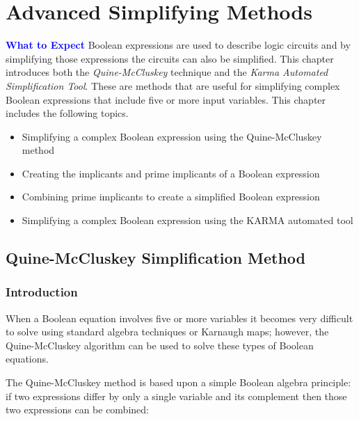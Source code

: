 \chapter{Advanced Simplifying Methods}\label{ch07}

\begin{tcolorbox}[colback=blue!5!white,colframe=blue!75!black]
	\textcolor{blue}{\textbf{What to Expect}}
	\tcblower
	Boolean expressions are used to describe logic circuits and by simplifying those expressions the circuits can also be simplified. This chapter introduces both the \textit{Quine-McCluskey} technique and the \textit{Karma Automated Simplification Tool}. These are methods that are useful for simplifying complex Boolean expressions that include five or more input variables. This chapter includes the following topics.
	
	\begin{itemize}
		\item Simplifying a complex Boolean expression using the Quine-McCluskey method
		\item Creating the implicants and prime implicants of a Boolean expression
		\item Combining prime implicants to create a simplified Boolean expression
		\item Simplifying a complex Boolean expression using the KARMA automated tool
	\end{itemize}
	
\end{tcolorbox}

\section{Quine-McCluskey Simplification Method}
\subsection{Introduction}

 When a Boolean equation involves five or more variables it becomes very difficult to solve using standard algebra techniques or Karnaugh maps; however, the Quine-McCluskey algorithm can be used to solve these types of Boolean equations.  

The Quine-McCluskey method is based upon a simple Boolean algebra principle: if two expressions differ by only a single variable and its complement then those two expressions can be combined: 

